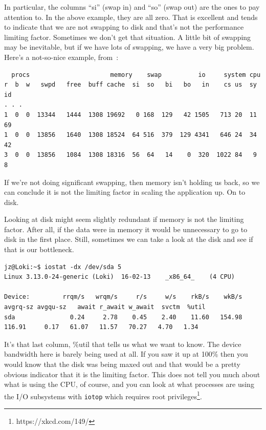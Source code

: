 \documentclass[a4paper]{report}
\begin{document}
In particular, the columns ``si'' (swap in) and ``so'' (swap out) are the ones to pay attention to. In the above example, they are all zero. That is excellent and tends to indicate that we are not swapping to disk and that's not the performance limiting factor. Sometimes we don't get that situation. A little bit of swapping may be inevitable, but if we have lots of swapping, we have a very big problem. Here's a not-so-nice example, from~\cite{vmstat}:

\begin{verbatim}
  procs                      memory    swap          io     system cpu
r  b  w   swpd   free  buff cache  si  so   bi   bo   in    cs us  sy  id
. . .
1  0  0  13344   1444  1308 19692   0 168  129   42 1505   713 20  11  69
1  0  0  13856   1640  1308 18524  64 516  379  129 4341   646 24  34  42
3  0  0  13856   1084  1308 18316  56  64   14    0  320  1022 84   9   8
\end{verbatim}

If we're not doing significant swapping, then memory isn't holding us back, so we can conclude it is not the limiting factor in scaling the application up. On to disk.

Looking at disk might seem slightly redundant if memory is not the limiting factor. After all, if the data were in memory it would be unnecessary to go to disk in the first place. Still, sometimes we can take a look at the disk and see if that is our bottleneck.

{\scriptsize
\begin{verbatim}
jz@Loki:~$ iostat -dx /dev/sda 5 
Linux 3.13.0-24-generic (Loki) 	16-02-13 	_x86_64_	(4 CPU)

Device:         rrqm/s   wrqm/s     r/s     w/s    rkB/s    wkB/s avgrq-sz avgqu-sz   await r_await w_await  svctm  %util
sda               0.24     2.78    0.45    2.40    11.60   154.98   116.91     0.17   61.07   11.57   70.27   4.70   1.34
\end{verbatim}
}

It's that last column, \%util that tells us what we want to know. The device bandwidth here is barely being used at all. If you saw it up at 100\% then you would know that the disk was being maxed out and that would be a pretty obvious indicator that it is the limiting factor. This does not tell you much about what is using the CPU, of course, and you can look at what processes are using the I/O subsystems with \texttt{iotop} which requires root privileges\footnote{https://xkcd.com/149/}.
\end{document}
